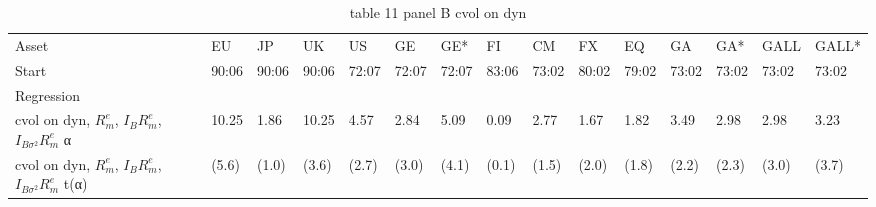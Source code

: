 \begin{table}[htbp]
  \centering
  \caption{table 11 panel B cvol on dyn}
  \label{tab:table_11_panel_B_cvol_on_dyn}
  \begin{tabular}{lllllllllllllll}
\toprule
Asset & EU & JP & UK & US & GE & GE* & FI & CM & FX & EQ & GA & GA* & GALL & GALL* \\
Start & 90:06 & 90:06 & 90:06 & 72:07 & 72:07 & 72:07 & 83:06 & 73:02 & 80:02 & 79:02 & 73:02 & 73:02 & 73:02 & 73:02 \\
Regression &  &  &  &  &  &  &  &  &  &  &  &  &  &  \\
\midrule
cvol on dyn, $R^e_m$, $I_B R^e_m$, $I_{B\sigma^2} R^e_m$ α & 10.25 & 1.86 & 10.25 & 4.57 & 2.84 & 5.09 & 0.09 & 2.77 & 1.67 & 1.82 & 3.49 & 2.98 & 2.98 & 3.23 \\
cvol on dyn, $R^e_m$, $I_B R^e_m$, $I_{B\sigma^2} R^e_m$ t(α) & (5.6) & (1.0) & (3.6) & (2.7) & (3.0) & (4.1) & (0.1) & (1.5) & (2.0) & (1.8) & (2.2) & (2.3) & (3.0) & (3.7) \\
\bottomrule
\end{tabular}

\end{table}
